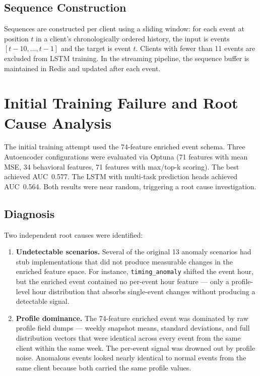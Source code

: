 \subsection{Sequence Construction}

Sequences are constructed per client using a sliding window: for each event
at position $t$ in a client's chronologically ordered history, the input
is events $[t{-}10, \ldots, t{-}1]$ and the target is event $t$. Clients
with fewer than 11 events are excluded from LSTM training. In the streaming
pipeline, the sequence buffer is maintained in Redis and updated after each
event.

\section{Initial Training Failure and Root Cause Analysis}
\label{sec:pipeline-rebuild}

The initial training attempt used the 74-feature enriched event schema.
Three Autoencoder configurations were evaluated via Optuna (71 features
with mean MSE, 34 behavioral features, 71 features with max/top-k
scoring). The best achieved AUC~0.577. The LSTM with multi-task prediction
heads achieved AUC~0.564. Both results were near random, triggering a
root cause investigation.

\subsection{Diagnosis}

Two independent root causes were identified:

\begin{enumerate}[leftmargin=2cm]
    \item \textbf{Undetectable scenarios.} Several of the original 13
          anomaly scenarios had stub implementations that did not produce
          measurable changes in the enriched feature space. For instance,
          \texttt{timing\_anomaly} shifted the event hour, but the enriched
          event contained no per-event hour feature --- only a profile-level
          hour distribution that absorbs single-event changes without
          producing a detectable signal.

    \item \textbf{Profile dominance.} The 74-feature enriched event was
          dominated by raw profile field dumps --- weekly snapshot means,
          standard deviations, and full distribution vectors that were
          identical across every event from the same client within the
          same week. The per-event signal was drowned out by profile noise.
          Anomalous events looked nearly identical to normal events from
          the same client because both carried the same profile values.
\end{enumerate}

